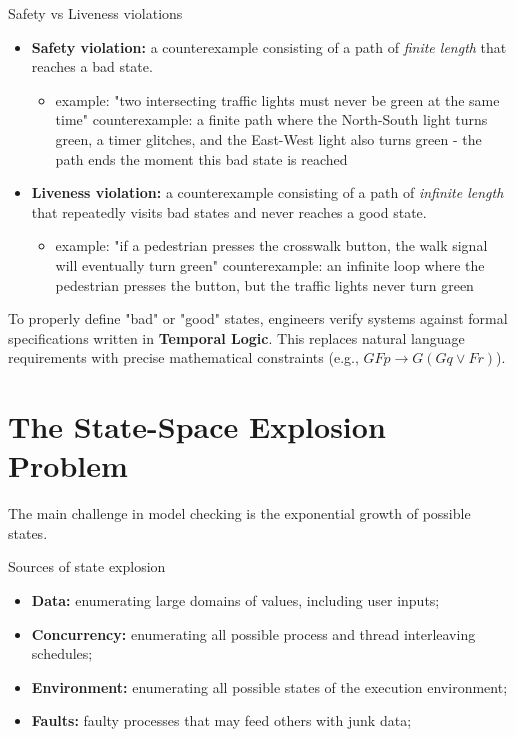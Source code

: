 \documentclass[a4paper, 11pt]{report}
\begin{document}
\begin{gframe}{Safety vs Liveness violations}
\begin{itemize}
    \item \textbf{Safety violation:} a counterexample consisting of a path of \textit{finite length} that reaches a bad state.
    \begin{itemize}
        \item example: "two intersecting traffic lights must never be green at the same time"
        \subitem counterexample: a finite path where the North-South light turns green, a timer glitches, and the East-West light also turns green - the path ends the moment this bad state is reached
    \end{itemize}
    \item \textbf{Liveness violation:} a counterexample consisting of a path of \textit{infinite length} that repeatedly visits bad states and never reaches a good state.
    \begin{itemize}
        \item example: "if a pedestrian presses the crosswalk button, the walk signal will eventually turn green"
        \subitem counterexample: an infinite loop where the pedestrian presses the button, but the traffic lights never turn green
    \end{itemize}
\end{itemize}
\end{gframe}

To properly define "bad" or "good" states, engineers verify systems against formal specifications written in \textbf{Temporal Logic}. This replaces natural language requirements with precise mathematical constraints (e.g., $GFp \to G(Gq \vee Fr)$).

\section{The State-Space Explosion Problem}
The main challenge in model checking is the exponential growth of possible states.

\begin{gframe}{Sources of state explosion}
\begin{itemize}
    \item \textbf{Data:} enumerating large domains of values, including user inputs;
    \item \textbf{Concurrency:} enumerating all possible process and thread interleaving schedules;
    \item \textbf{Environment:} enumerating all possible states of the execution environment;
    \item \textbf{Faults:} faulty processes that may feed others with junk data;
\end{itemize}
\end{gframe}
\end{document}
